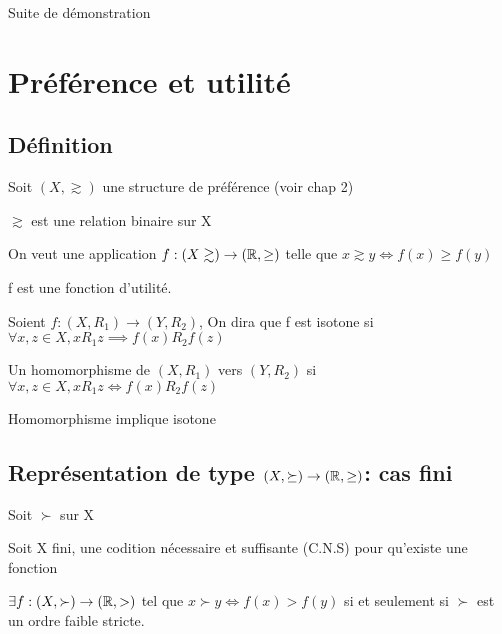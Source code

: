 \documentclass[a4paper, 12pt]{article}
\begin{document}


Suite de démonstration

\begin{demonstration}

\end{demonstration}

\section{Préférence et utilité}

\subsection{Définition}

\begin{definition}
    Soit $(X, \gtrsim)$ une structure de préférence (voir chap 2)

    $\gtrsim$ est une relation binaire sur X
\end{definition}

On veut une application $f: (X \gtrsim) \rightarrow (\mathbb{R}, \geq)$ telle que $x \gtrsim y \iff f(x) \geq f(y)$

f est une fonction d'utilité.

Soient $f: (X, R_1) \rightarrow (Y, R_2)$, On dira que f est isotone si $\forall x, z \in X, xR_1 z \implies f(x)R_2 f(z)$

Un homomorphisme de $(X, R_1)$ vers $(Y, R_2)$ si $\forall x, z \in X, x R_1 z \iff f(x)R_2 f(z)$

\begin{remark}
    Homomorphisme implique isotone
\end{remark}





\subsection{Représentation de type $(X, \succeq) \rightarrow (\mathbb{R}, \geq)$: cas fini}

Soit $\succ$ sur X

\begin{proposition}
    Soit X fini, une codition nécessaire et suffisante (C.N.S) pour qu'existe une fonction

    $\exists f: (X, \succ) \rightarrow (\mathbb{R}, >)$ tel que $x \succ y \iff f(x) \gt f(y)$ si et seulement si $\succ$ est un ordre faible stricte.
\end{proposition}
\end{document}
